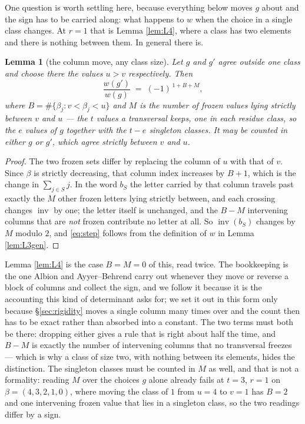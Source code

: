 \documentclass[11pt,reqno]{amsart}
\theoremstyle{plain}
\newtheorem{lemma}[theorem]{Lemma}
\theoremstyle{definition}
\newcommand{\inv}{\operatorname{inv}}
\begin{document}
One question is worth settling here, because everything below moves $g$ about and the sign has to be
carried along: what happens to $w$ when the choice in a single class changes. At $r=1$ that is Lemma
\ref{lem:L4}, where a class has two elements and there is nothing between them. In general there is.

\begin{lemma}[the column move, any class size]\label{lem:step}
Let $g$ and $g'$ agree outside one class and choose there the values $u>v$ respectively. Then
\begin{equation}\label{eq:step}
\frac{w(g')}{w(g)}\;=\;(-1)^{\,1+B+M},
\end{equation}
where $B=\#\{\beta_j:v<\beta_j<u\}$ and $M$ is the number of \emph{frozen} values lying strictly
between $v$ and $u$ --- the $t$ values a transversal keeps, one in each residue class, so the $e$
values of $g$ together with the $t-e$ singleton classes. It may be counted in either $g$ or $g'$,
which agree strictly between $v$ and $u$.
\end{lemma}

\begin{proof}
The two frozen sets differ by replacing the column of $u$ with that of $v$. Since $\beta$ is strictly
decreasing, that column index increases by $B+1$, which is the change in $\sum_{j\in S}j$. In the
word $b_S$ the letter carried by that column travels past exactly the $M$ other frozen letters lying
strictly between, and each crossing changes $\inv$ by one; the letter itself is unchanged, and the
$B-M$ intervening columns that are \emph{not} frozen contribute no letter at all. So
$\inv(b_S)$ changes by $M$ modulo $2$, and \eqref{eq:step} follows from the definition of $w$ in
Lemma \ref{lem:L3gen}.
\end{proof}

\noindent Lemma \ref{lem:L4} is the case $B=M=0$ of this, read twice. The bookkeeping is the one
Albion \cite{Alb23,Alb25} and Ayyer--Behrend \cite{AB19} carry out whenever they move or reverse a
block of columns and collect the sign, and we follow it because it is the accounting this kind of
determinant asks for; we set it out in this form only because \S\ref{sec:rigidity} moves a single
column many times over and the count then has to be exact rather than absorbed into a constant. The
two terms must both be there: dropping either gives a rule that is right about half the time, and
$B-M$ is exactly the number of intervening columns that no transversal freezes --- which is why a
class of size two, with nothing between its elements, hides the distinction. The singleton classes
must be counted in $M$ as well, and that is not a formality: reading $M$ over the choices $g$ alone
already fails at $t=3$, $r=1$ on $\beta=(4,3,2,1,0)$, where moving the class of $1$ from $u=4$ to
$v=1$ has $B=2$ and one intervening frozen value that lies in a singleton class, so the two readings
differ by a sign.
\end{document}
